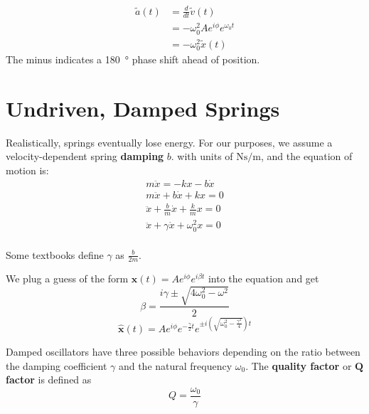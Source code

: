\documentclass[a4paper, titlepage]{book}
\begin{document}
\begin{equation}
    \begin{aligned}
            \tilde{a}(t) &= \frac{d}{dt} \tilde{v}(t) \\
            &= -\omega_0^2 A e^{i\phi} e^{\omega_0 t} \\
            &= -\omega_0^2 \tilde{x}(t)
    \end{aligned}
\end{equation}
The minus indicates a \qty{180}{\degree} phase shift ahead of position.

\section{Undriven, Damped Springs}
Realistically, springs eventually lose energy.
For our purposes, we assume a velocity-dependent spring \textbf{damping} \(b\).
with units of \(\unit{\newton \second \per \meter}\),
and the equation of motion is:
\begin{equation}
    \begin{aligned}
        m \ddot{x} = -kx - b \dot{x} \\
        m \ddot{x} + b \dot{x} + kx = 0 \\
        \ddot{x} + \frac{b}{m} \dot{x} + \frac{k}{m} x = 0 \\
        \ddot{x} + \gamma \dot{x} + \omega_0^2 x = 0 \\
    \end{aligned}
\end{equation}

Some textbooks define \(\gamma\) as \(\frac{b}{2m}\).

We plug a guess of the form \(\boldsymbol{\hat{x}}(t) = A e^{i \phi} e^{i \beta t}\)
into the equation and get
\begin{equation}
    \beta = \frac{i \gamma \pm \sqrt{4\omega_0^2 - \omega^2}}{2}
\end{equation}
\begin{equation}
    \boldsymbol{\hat{x}}(t)
    = A e^{i\phi} e^{-\frac{\gamma}{2}t} e^{\pm i \left(\sqrt{\omega_0^2 - \frac{\gamma^2}{4}}\right) t}
\end{equation}

Damped oscillators have three possible behaviors
depending on the ratio between the damping coefficient \(\gamma\)
and the natural frequency \(\omega_0\).
The \textbf{quality factor} or \textbf{\(\boldsymbol{Q}\) factor} is defined as
\begin{equation}
    Q = \frac{\omega_0}{\gamma}
\end{equation}
\end{document}

